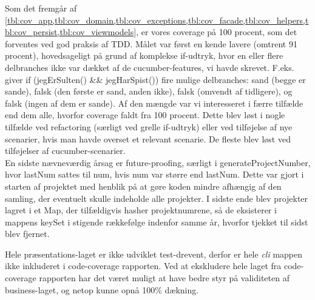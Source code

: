 \noindent
Som det fremgår af \cref{tbl:cov_app,tbl:cov_domain,tbl:cov_exceptions,tbl:cov_facade,tbl:cov_helpers,tbl:cov_persist,tbl:cov_viewmodels}, er vores coverage på 100 procent, som det forventes ved god praksis af TDD. Målet var først en kende lavere (omtrent 91 procent), hovedsageligt på grund af komplekse if-udtryk, hvor en eller flere delbranches ikke var dækket af de cucumber-features, vi havde skrevet. F.eks. giver if (jegErSulten() \&\& jegHarSpist()) fire mulige delbranches: sand (begge er sande), falsk (den første er sand, anden ikke), falsk (omvendt af tidligere), og falsk (ingen af dem er sande). Af den mængde var vi interesseret i færre tilfælde end dem alle, hvorfor coverage faldt fra 100 procent. Dette blev løst i nogle tilfælde ved refactoring (særligt ved grelle if-udtryk) eller ved tilføjelse af nye scenarier, hvis man havde overset et relevant scenarie. De fleste blev løst ved tilføjelser af cucumber-scenarier.\\[4mm] En sidste nævneværdig årsag er future-proofing, særligt i generateProjectNumber, hvor lastNum sattes til num, hvis num var større end lastNum. Dette var gjort i starten af projektet med henblik på at gøre koden mindre afhængig af den samling, der eventuelt skulle indeholde alle projekter. I sidste ende blev projekter lagret i et Map, der tilfældigvis hasher projektnumrene, så de eksisterer i mappens keySet i stigende rækkefølge indenfor samme år, hvorfor tjekket til sidst blev fjernet. 

Hele præsentations-laget er ikke udviklet test-drevent, derfor er hele \textit{cli} mappen ikke inkluderet i code-coverage rapporten. Ved at ekskludere hele laget fra code-coverage rapporten har det været muligt at have bedre styr på validiteten af business-laget, og netop kunne opnå 100\% dækning.